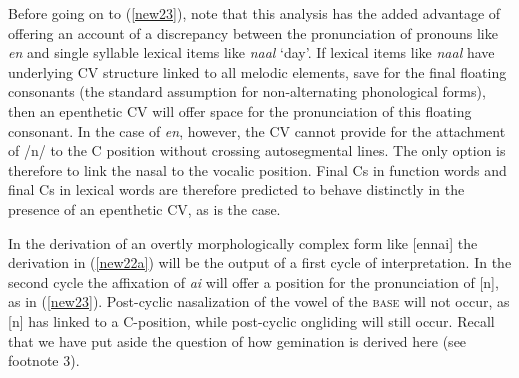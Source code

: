 \documentclass[output=paper,colorlinks,citecolor=brown,
]{langscibook}
\begin{document}
Before going on to (\ref{new23}), note that this analysis has the added advantage of offering an account of a discrepancy between the pronunciation of pronouns like \textit{en} and single syllable lexical items like \textit{naal} ‘day’. If lexical items like \textit{naal} have underlying CV structure linked to all melodic elements, save for the final floating consonants (the standard assumption for non-alternating phonological forms), then an epenthetic CV will offer space for the pronunciation of this floating consonant. In the case of \textit{en}, however, the CV cannot provide for the attachment of /n/ to the C position without crossing autosegmental lines. The only option is therefore to link the nasal to the vocalic position. Final Cs in function words and final Cs in lexical words are therefore predicted to behave distinctly in the presence of an epenthetic CV, as is the case.

In the derivation of an overtly morphologically complex form like [ennai] the derivation in (\ref{new22a}) will be the output of a first cycle of interpretation. In the second cycle the affixation of \textit{ai} will offer a position for the pronunciation of [n], as in (\ref{new23}). Post-cyclic nasalization of the vowel of the \textsc{base} will not occur, as [n] has linked to a C-position, while post-cyclic ongliding will still occur. Recall that we have put aside the question of how gemination is derived here (see footnote 3).
\end{document}
